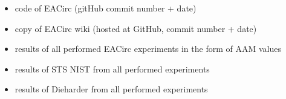\documentclass[12pt,oneside]{fithesis2}
\newcommand{\squarebullet}{\textcolor{black}{\raisebox{0.15em}{\rule{4pt}{4pt}}}}
\newenvironment{myItemize}{
  \begin{itemize}[leftmargin=2em,rightmargin=1em,itemsep=\parskip ,parsep=0em,topsep=0em,partopsep=0em]
  \renewcommand{\labelitemi}{\squarebullet}
  \renewcommand{\labelitemii}{$\diamond$}
}{
  \end{itemize}
}
\begin{document}
\begin{myItemize}
\item code of EACirc (gitHub commit number + date)
\item copy of EACirc wiki (hosted at GitHub, commit number + date)
\item results of all performed EACirc experiments in the form of AAM values
\item results of STS NIST from all performed experiments
\item results of Dieharder from all performed experiments
\end{myItemize}

\nocite{*}
\printbibliography
\end{document}
